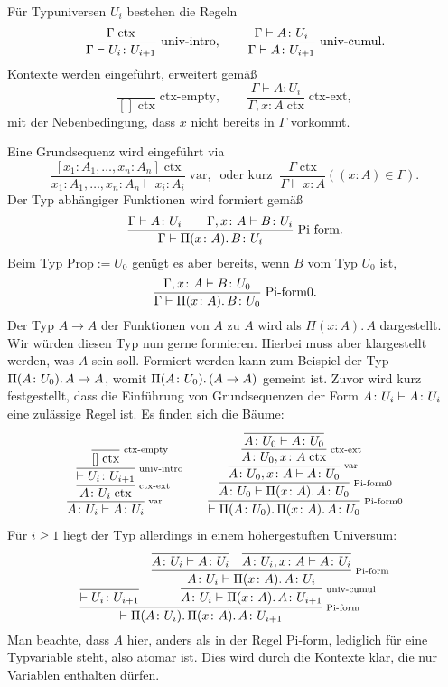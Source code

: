 Für Typuniversen $U_i$ bestehen die Regeln 
\[\dfrac{\Gamma\;\mathrm{ctx}}{\Gamma\vdash U_i\colon U_{i+1}}\;\text{univ-intro},
\qquad\dfrac{\Gamma\vdash A\colon U_i}{\Gamma\vdash A\colon U_{i+1}}\;\text{univ-cumul}.\]
Kontexte werden eingeführt, erweitert gemäß
\[\dfrac{}{[]\;\mathrm{ctx}}\;\text{ctx-empty},\qquad
\dfrac{\Gamma\vdash A\colon U_i}{\Gamma,x\colon A\;\mathrm{ctx}}\;\text{ctx-ext},\]
mit der Nebenbedingung, dass $x$ nicht bereits in $\Gamma$ vorkommt.

Eine Grundsequenz wird eingeführt via
\[\dfrac{[x_1\colon A_1, \ldots, x_n\colon A_n]\;\mathrm{ctx}}{
x_1\colon A_1, \ldots, x_n\colon A_n\vdash x_i\colon A_i}\;\mathrm{var},\;\;\text{oder kurz}\;\;
\dfrac{\Gamma\;\mathrm{ctx}}{\Gamma\vdash x\colon A}((x\colon A)\in\Gamma).\]
Der Typ abhängiger Funktionen wird formiert gemäß
\[\dfrac{\Gamma\vdash A\colon U_i\qquad\Gamma,x\colon A\vdash B\colon U_i}{
  \Gamma\vdash\Pi(x\colon A).\,B\colon U_i}\;\text{Pi-form}.\]
Beim Typ $\mathrm{Prop}:=U_0$ genügt es aber bereits, wenn $B$ vom Typ $U_0$ ist,
\[\dfrac{\Gamma,x\colon A\vdash B\colon U_0}{
  \Gamma\vdash\Pi(x\colon A).\,B\colon U_0}\;\text{Pi-form0}.\]
Der Typ $A\to A$ der Funktionen von $A$ zu $A$ wird als
$\Pi(x\colon A).\, A$ dargestellt. Wir würden diesen Typ nun gerne
formieren. Hierbei muss aber klargestellt werden, was $A$ sein soll.
Formiert werden kann zum Beispiel der Typ $\Pi(A\colon U_0).\,A\to A$,
womit $\Pi(A\colon U_0).\,(A\to A)$ gemeint ist.
Zuvor wird kurz festgestellt, dass die Einführung von Grundsequenzen der
Form $A\colon U_i\vdash A\colon U_i$ eine zulässige Regel ist.
Es finden sich die Bäume:
\[
\begin{array}{l@{\qquad}l}
\infer[\infernote{var}]{A\colon\typeuniv_i\vdash A\colon\typeuniv_i}{
  \infer[\infernote{ctx-ext}]{A\colon\typeuniv_i\;\mathrm{ctx}}{
    \infer[\infernote{univ-intro}]{\vdash\typeuniv_i\colon\typeuniv_{i+1}}{
      \infer[\infernote{ctx-empty}]{[]\;\mathrm{ctx}}{}}}}
&
\infer[\infernote{Pi-form0}]{\vdash\Pi(A\colon\typeuniv_0).\, \Pi(x\colon A).\, A\colon\typeuniv_0}{
  \infer[\infernote{Pi-form0}]{A\colon\typeuniv_0\vdash\Pi(x\colon A).\, A\colon\typeuniv_0}{
    \infer[\infernote{var}]{A\colon\typeuniv_0,x\colon A\vdash A\colon\typeuniv_0}{
      \infer[\infernote{ctx-ext}]{A\colon\typeuniv_0,x\colon A\;\mathrm{ctx}}{
        \infer{A\colon\typeuniv_0\vdash A\colon\typeuniv_0}{}}}}}
\end{array}
\]
Für $i\ge 1$ liegt der Typ allerdings in einem höhergestuften Universum:
\[
\infer[\infernote{Pi-form}]{\vdash\Pi(A\colon\typeuniv_i).\, \Pi(x\colon A).\, A\colon\typeuniv_{i+1}}{
  \infer{\vdash\typeuniv_i\colon\typeuniv_{i+1}}{}
  & \infer[\infernote{univ-cumul}]{A\colon\typeuniv_i\vdash\Pi(x\colon A).\, A\colon\typeuniv_{i+1}}{
      \infer[\infernote{Pi-form}]{A\colon\typeuniv_i\vdash\Pi(x\colon A).\, A\colon\typeuniv_i}{
        \infer{A\colon\typeuniv_i\vdash A\colon\typeuniv_i}{}
      & \infer{A\colon\typeuniv_i,x\colon A\vdash A\colon\typeuniv_i}{}}}}
\]
Man beachte, dass $A$ hier, anders als in der Regel Pi-form, lediglich
für eine Typvariable steht, also atomar ist. Dies wird durch die
Kontexte klar, die nur Variablen enthalten dürfen.

